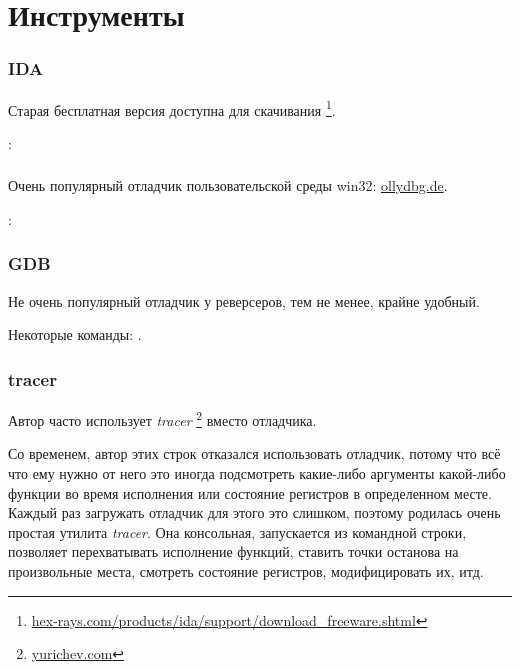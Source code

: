 \chapter{Инструменты}


\subsection{IDA}

\label{IDA}
Старая бесплатная версия доступна для скачивания
\footnote{\href{http://go.yurichev.com/17031}{hex-rays.com/products/ida/support/download\_freeware.shtml}}.

\ShortHotKeyCheatsheet: 


\subsection{\olly}
\myindex{\olly}

Очень популярный отладчик пользовательской среды win32: \href{http://go.yurichev.com/17032}{ollydbg.de}.

\ShortHotKeyCheatsheet: 

\subsection{GDB}

Не очень популярный отладчик у реверсеров, тем не менее, крайне удобный.

Некоторые команды: .

\subsection{tracer}

\label{tracer}
Автор часто использует \emph{tracer}
\footnote{\href{http://go.yurichev.com/17339}{yurichev.com}}
вместо отладчика.

Со временем, автор этих строк отказался использовать отладчик, потому что всё что ему нужно от него это иногда подсмотреть 
какие-либо аргументы какой-либо функции во время исполнения или состояние регистров в определенном месте. 
Каждый раз загружать отладчик для этого это слишком, поэтому родилась очень простая утилита \emph{tracer}. 
Она консольная, запускается из командной строки, позволяет перехватывать исполнение функций, 
ставить точки останова на произвольные места, смотреть состояние регистров, модифицировать их, итд.

